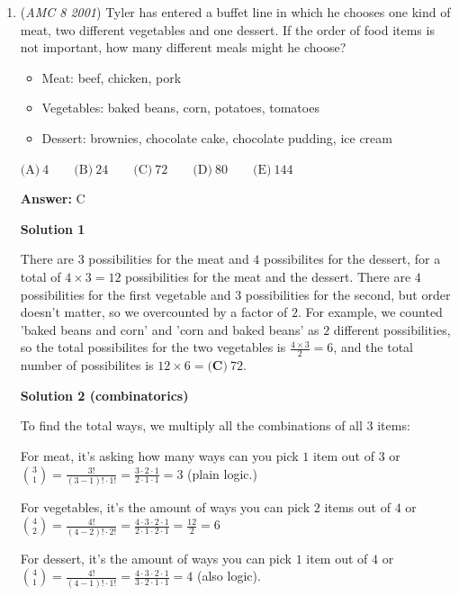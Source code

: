 \begin{enumerate}
	\item (\textit{AMC 8 2001}) Tyler has entered a buffet line in which he chooses one kind of meat, two different vegetables and one dessert. If the order of food items is not important, how many different meals might he choose?


 
            \begin{itemize}
        \item Meat: beef, chicken, pork

        \item Vegetables: baked beans, corn, potatoes, tomatoes

        \item Dessert: brownies, chocolate cake, chocolate pudding, ice cream
            \end{itemize}
            $\text{(A)}\ 4 \qquad \text{(B)}\ 24 \qquad \text{(C)}\ 72 \qquad \text{(D)}\ 80 \qquad \text{(E)}\ 144$

 \textbf{Answer: }C



\textbf{Solution 1}

There are $3$ possibilities for the meat and $4$ possibilites for the dessert, for a total of $4\times3=12$ possibilities for the meat and the dessert. There are $4$ possibilities for the first vegetable and $3$ possibilities for the second, but order doesn't matter, so we overcounted by a factor of $2$. For example, we counted 'baked beans and corn' and 'corn and baked beans' as $2$ different possibilities, so the total possibilites for the two vegetables is $\frac{4\times3}{2}=6$, and the total number of possibilites is $12\times6=\boxed{\textbf{(C)}\ 72}.$




\textbf{Solution 2 (combinatorics)}

To find the total ways, we multiply all the combinations of all 3 items:

 For meat, it's asking how many ways can you pick $1$ item out of $3$ or $\binom{3}{1} = \frac{3!}{(3-1)! \cdot 1!} = \frac{3 \cdot 2 \cdot 1}{2 \cdot 1 \cdot 1} = 3$ (plain logic.)

 For vegetables, it's the amount of ways you can pick $2$ items out of $4$ or $\binom{4}{2} = \frac{4!}{(4-2)! \cdot 2!} = \frac{4 \cdot 3 \cdot 2 \cdot 1}{2 \cdot 1 \cdot 2 \cdot 1} = \frac{12}{2} = 6$

 For dessert, it's the amount of ways you can pick $1$ item out of $4$ or $\binom{4}{1} = \frac{4!}{(4-1)! \cdot 1!} = \frac{4 \cdot 3 \cdot 2 \cdot 1}{3 \cdot 2 \cdot 1 \cdot 1} = 4$ (also logic).


\end{enumerate}
